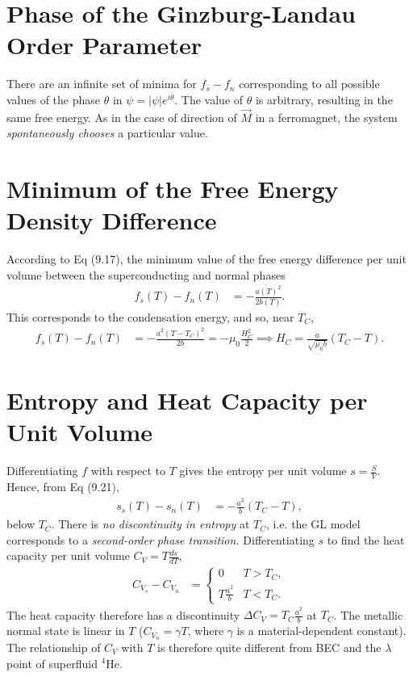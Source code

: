 \documentclass[a4paper, 11pt, normalem]{report}
\begin{document}
\section{Phase of the Ginzburg-Landau Order Parameter}
There are an infinite set of minima for $f_s-f_n$ corresponding to all possible values of the phase $\theta$ in $\psi=|\psi|e^{i\theta}$.
The value of $\theta$ is arbitrary, resulting in the same free energy.
As in the case of direction of $\vec{M}$ in a ferromagnet, the system \emph{spontaneously chooses} a particular value.

\section{Minimum of the Free Energy Density Difference}
According to Eq (9.17), the minimum value of the free energy difference per unit volume between the superconducting and normal phases
\begin{align}
    f_s(T) - f_n(T) &= -\frac{a(T)^2}{2b(T)}.
\end{align}
This corresponds to the condensation energy, and so, near $T_C$,
\begin{align}
    f_s(T) - f_n(T) &= -\frac{\dot{a}^2(T-T_C)^2}{2b} = -\mu_0\frac{H_C^2}{2}\implies H_C = \frac{\dot{a}}{\sqrt{\mu_0 b}}(T_C-T).
\end{align}

\section{Entropy and Heat Capacity per Unit Volume}
Differentiating $f$ with respect to $T$ gives the entropy per unit volume $s=\frac{S}{V}$.
Hence, from Eq (9.21),
\begin{align}
    s_s(T) - s_n(T) &= -\frac{\dot{a}^2}{b}(T_C-T),
\end{align}
below $T_C$.
There is \emph{no discontinuity in entropy} at $T_C$, i.e. the GL model corresponds to a \emph{second-order phase transition.}
Differentiating $s$ to find the heat capacity per unit volume $C_V=T\frac{ds}{dT}$,
\begin{align}
    C_{V_s} - C_{V_n} &= \begin{cases} 0 & T>T_C, \\ T\frac{\dot{a}^2}{b} & T<T_C.\end{cases}
\end{align}
The heat capacity therefore has a discontinuity $\Delta C_V = T_C\frac{\dot{a}^2}{b}$ at $T_C$.
The metallic normal state is linear in $T$ ($C_{V_n}=\gamma T$, where $\gamma$ is a material-dependent constant).
The relationship of $C_V$ with $T$ is therefore quite different from BEC and the $\lambda$ point of superfluid ${}^4$He.
\end{document}
